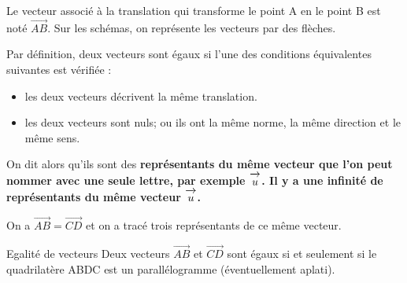 \documentclass[10pt,a4paper,openany,twoside,prof]{book}
\begin{document}
\begin{notation}{}{}
	Le vecteur associé à la translation qui transforme le point A en le point B est noté $\vec{AB}$. Sur les schémas, on représente les vecteurs par des flèches.
\end{notation}

\begin{rem}{}{}
	Par définition, deux vecteurs sont égaux si l'une des conditions équivalentes suivantes est vérifiée :
	\begin{itemize}
  		\item les deux vecteurs décrivent la même translation.
		\item les deux vecteurs sont nuls; ou ils ont la même norme, la même direction et le même sens.
	\end{itemize}

	On dit alors qu'ils sont des \bf{représentants} du même vecteur que l'on peut nommer avec une seule lettre, par exemple $\overrightarrow{\,\mathstrut u\,}$. Il y a une infinité de \bf{représentants} du même vecteur $\overrightarrow{\,\mathstrut u\,}$.

\end{rem}


\begin{ex}{}{}
	\begin{minipage}{0.45\linewidth}
	\begin{center}
		\end{center}
	\end{minipage}
	\begin{minipage}{0.45\linewidth}
		On a $\vec{AB}=\vec{CD}$ et on a tracé trois représentants de ce même vecteur.
	\end{minipage}
\end{ex}

\begin{theo}{Egalité de vecteurs}{}
	Deux vecteurs $\vec{AB}$ et $\vec{CD}$  sont égaux si et seulement si le quadrilatère ABDC est un parallélogramme (éventuellement aplati).
	\begin{center}
	\end{center}
\end{theo}
\end{document}
